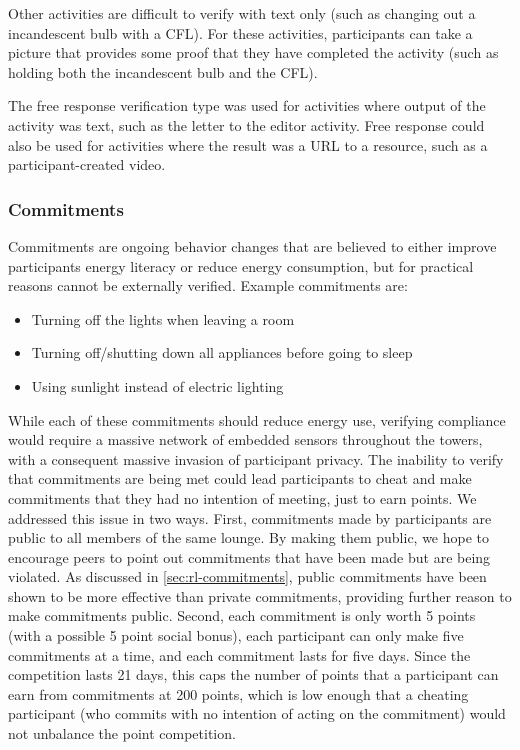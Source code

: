 Other activities are difficult to verify with text only (such as changing out a incandescent bulb with a CFL). For these activities, participants can take a picture that provides some proof that they have completed the activity (such as holding both the incandescent bulb and the CFL).

The free response verification type was used for activities where output of the activity was text, such as the letter to the editor activity. Free response could also be used for activities where the result was a URL to a resource, such as a participant-created video.


\subsubsection{Commitments}

Commitments are ongoing behavior changes that are believed to either improve participants energy literacy or reduce energy consumption, but for practical reasons cannot be externally verified. Example commitments are:

\begin{itemize}
	\item Turning off the lights when leaving a room
	\item Turning off/shutting down all appliances before going to sleep
	\item Using sunlight instead of electric lighting
\end{itemize}

While each of these commitments should reduce energy use, verifying compliance would require a massive network of embedded sensors throughout the towers, with a consequent massive invasion of participant privacy. The inability to verify that commitments are being met could lead participants to cheat and make commitments that they had no intention of meeting, just to earn points. We addressed this issue in two ways. First, commitments made by participants are public to all members of the same lounge. By making them public, we hope to encourage peers to point out commitments that have been made but are being violated. As discussed in \autoref{sec:rl-commitments}, public commitments have been shown to be more effective than private commitments, providing further reason to make commitments public. Second, each commitment is only worth 5 points (with a possible 5 point social bonus), each participant can only make five commitments at a time, and each commitment lasts for five days. Since the competition lasts 21 days, this caps the number of points that a participant can earn from commitments at 200 points, which is low enough that a cheating participant (who commits with no intention of acting on the commitment) would not unbalance the point competition.

